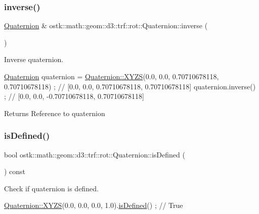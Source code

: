 \subsubsection{\texorpdfstring{inverse()}{inverse()}}
{\footnotesize\ttfamily \hyperlink{classostk_1_1math_1_1geom_1_1d3_1_1trf_1_1rot_1_1_quaternion}{Quaternion} \& ostk\+::math\+::geom\+::d3\+::trf\+::rot\+::\+Quaternion\+::inverse (\begin{DoxyParamCaption}{ }\end{DoxyParamCaption})}



Inverse quaternion. 


\begin{DoxyCode}
\hyperlink{classostk_1_1math_1_1geom_1_1d3_1_1trf_1_1rot_1_1_quaternion_ad9fd7d8eb5effb4d4e0394bbb5bb86dc}{Quaternion} quaternion = \hyperlink{classostk_1_1math_1_1geom_1_1d3_1_1trf_1_1rot_1_1_quaternion_ac57ea57a4033622ed1389101b2e58c76}{Quaternion::XYZS}(0.0, 0.0, 0.70710678118, 0.70710678118) 
      ; \textcolor{comment}{// [0.0, 0.0, 0.70710678118, 0.70710678118]}
quaternion.inverse() ; \textcolor{comment}{// [0.0, 0.0, -0.70710678118, 0.70710678118]}
\end{DoxyCode}


\begin{DoxyReturn}{Returns}
Reference to quaternion 
\end{DoxyReturn}
\mbox{\label{classostk_1_1math_1_1geom_1_1d3_1_1trf_1_1rot_1_1_quaternion_a4d605d7242ef08aa841ab41df4e06a17}} 
\subsubsection{\texorpdfstring{is\+Defined()}{isDefined()}}
{\footnotesize\ttfamily bool ostk\+::math\+::geom\+::d3\+::trf\+::rot\+::\+Quaternion\+::is\+Defined (\begin{DoxyParamCaption}{ }\end{DoxyParamCaption}) const}



Check if quaternion is defined. 


\begin{DoxyCode}
\hyperlink{classostk_1_1math_1_1geom_1_1d3_1_1trf_1_1rot_1_1_quaternion_ac57ea57a4033622ed1389101b2e58c76}{Quaternion::XYZS}(0.0, 0.0, 0.0, 1.0).\hyperlink{classostk_1_1math_1_1geom_1_1d3_1_1trf_1_1rot_1_1_quaternion_a4d605d7242ef08aa841ab41df4e06a17}{isDefined}() ; \textcolor{comment}{// True}
\end{DoxyCode}


